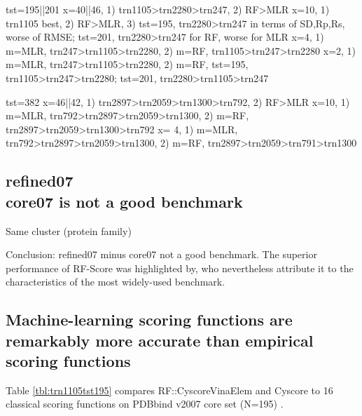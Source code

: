 \documentclass[journal=jacsat,manuscript=article]{achemso}
\begin{document}
tst=195||201
x=40||46, 1) trn1105>trn2280>trn247, 2) RF>MLR
x=10, 1) trn1105 best, 2) RF>MLR, 3) tst=195, trn2280>trn247 in terms of SD,Rp,Rs, worse of RMSE; tst=201, trn2280>trn247 for RF, worse for MLR
x=4, 1) m=MLR, trn247>trn1105>trn2280, 2) m=RF, trn1105>trn247>trn2280
x=2, 1) m=MLR, trn247>trn1105>trn2280, 2) m=RF, tst=195, trn1105>trn247>trn2280; tst=201, trn2280>trn1105>trn247

tst=382
x=46||42, 1) trn2897>trn2059>trn1300>trn792, 2) RF>MLR
x=10, 1) m=MLR, trn792>trn2897>trn2059>trn1300, 2) m=RF, trn2897>trn2059>trn1300>trn792
x= 4, 1) m=MLR, trn792>trn2897>trn2059>trn1300, 2) m=RF, trn2897>trn2059>trn791>trn1300

\subsection{refined07\\core07 is not a good benchmark}

Same cluster (protein family)

Conclusion: refined07 minus core07 not a good benchmark.
The superior performance of RF-Score was highlighted by, who nevertheless attribute it to the characteristics of the most widely-used benchmark. \cite{774}

\subsection{Machine-learning scoring functions are remarkably more accurate than empirical scoring functions}

Table \ref{tbl:trn1105tst195} compares RF::CyscoreVinaElem and Cyscore to 16 classical scoring functions on PDBbind v2007 core set (N=195) \cite{1313}.
\end{document}
